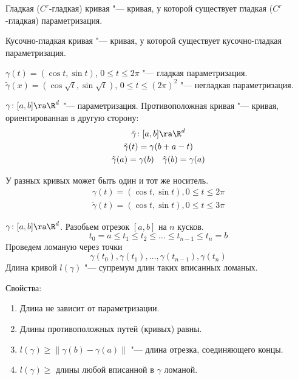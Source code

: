 \begin{Def}
	Гладкая ($C^r$-гладкая) кривая "--- кривая, у которой существует гладкая ($C^r$-гладкая) параметризация.
\end{Def}
\begin{Def}
	Кусочно-гладкая кривая "--- кривая, у которой существует кусочно-гладкая параметризация.
\end{Def}

\begin{exmp}
	$\gamma(t) = (\cos t, \sin t)$, $0 \le t \le 2\pi$ "--- гладкая параметризация.
	$\tilde \gamma(x) = (\cos \sqrt{t}, \sin\sqrt{t})$, $0 \le t \le (2\pi)^2$ "--- негладкая параметризация.
\end{exmp}

\begin{Def}
	$\gamma \colon [a, b] \ra \R^d$ "--- параметризация. Противоположная кривая "--- кривая, ориентированная в другую сторону:
	\begin{gather*}
		\tilde \gamma \colon [a, b] \ra \R^d \\
		\tilde \gamma(t) = \gamma(b + a - t) \\
		\tilde \gamma(a) = \gamma(b) \quad \tilde \gamma(b) = \gamma(a)
	\end{gather*}
\end{Def}

\begin{Rem}
	У разных кривых может быть один и тот же носитель.
	\begin{gather*}
		\gamma(t) = (\cos t, \sin t), 0 \le t \le 2\pi \\
		\tilde \gamma(t) = (\cos t, \sin t), 0 \le t \le 3\pi
	\end{gather*}
\end{Rem}

\begin{Def}
	$\gamma \colon [a, b] \ra \R^d$.
	Разобьем отрезок $[a, b]$ на $n$ кусков.
	\[ t_0 = a \le t_1 \le t_2 \le \dots \le t_{n-1} \le t_n = b \]
	Проведем ломаную через точки
	\[ \gamma(t_0), \gamma(t_1), \dots, \gamma(t_{n-1}), \gamma(t_n) \]
	Длина кривой $l(\gamma)$ "--- супремум длин таких вписанных ломаных.
\end{Def}

Свойства:
\begin{enumerate}
	\item Длина не зависит от параметризации.
	\item Длины противоположных путей (кривых) равны.
	\item $l(\gamma) \ge \|\gamma(b) - \gamma(a)\|$ "--- длина отрезка, соединяющего концы.
	\item $l(\gamma) \ge$ длины любой вписанной в $\gamma$ ломаной.
\end{enumerate}

